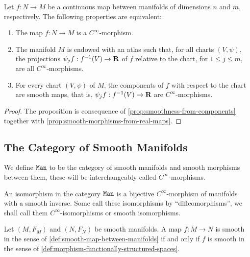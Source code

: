 \begin{corollary}
\label{prop:smoothness-from-components-manifolds}
Let \(f: N \to M\) be a continuous map between manifolds of dimensions \(n\) and
\(m\), respectively. The following properties are equivalent:
\begin{enumerate}\setlength\itemsep{0em}
\item The map \(f: N \to M\) is a \(C^{\infty}\)-morphism.

\item The manifold \(M\) is endowed with an atlas such that, for all charts
  \((V, \psi)\), the projections \(\psi_j f: f^{-1}(V) \to \mathbf{R}\) of \(f\)
  relative to the chart, for \(1 \leq j \leq m\), are all
  \(C^{\infty}\)-morphisms.

\item For every chart \((V, \psi)\) of \(M\), the components of \(f\) with
  respect to the chart are smooth maps, that is, \(\psi_j f: f^{-1}(V) \to \mathbf{R}\)
  are \(C^{\infty}\)-morphisms.
\end{enumerate}
\end{corollary}

\begin{proof}
The proposition is consequence of \cref{prop:smoothness-from-components}
together with \cref{prop:smooth-morphisms-from-real-maps}.
\end{proof}

\subsection{The Category of Smooth Manifolds}

\begin{definition}
\label{def:smooth-manifolds-category}
We define \({\texttt{Man}}\) to be the category of smooth manifolds and smooth morphisms
between them, these will be interchangeably called \(C^{\infty}\)-morphisms.
\end{definition}

\begin{corollary}
\label{cor:isomorphism-man}
An isomorphism in the category \({\texttt{Man}}\) is a bijective \(C^{\infty}\)-morphism
of manifolds with a smooth inverse. Some call these isomorphisms by
``diffeomorphisms'', we shall call them \(C^{\infty}\)-isomorphisms or smooth
isomorphisms.
\end{corollary}

\begin{lemma}
\label{lem:equiv-smooth-map-definition}
Let \((M, F_M)\) and \((N, F_N)\) be smooth manifolds. A map \(f: M \to N\) is
smooth in the sense of \cref{def:smooth-map-between-manifolds} if and only if
\(f\) is smooth in the sense of
\cref{def:morphism-functionally-structured-spaces}.
\end{lemma}

